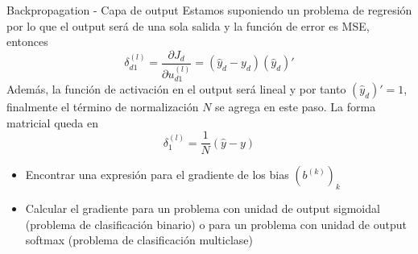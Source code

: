 \documentclass[9pt]{beamer}
\begin{document}
\begin{frame}{Backpropagation - Capa de output}
Estamos suponiendo un problema de regresión por lo que el output será de una sola salida y la función de error es MSE, entonces \pause
\[
\delta_{d1}^{(l)} = \frac{\partial J_d}{\partial u_{d1}^{(l)}} = (\hat{y}_d-y_d) (\hat{y}_d)' 
\] \pause
Además, la función de activación en el output será lineal y por tanto $(\hat{y}_d)' = 1$, finalmente el término de normalización $N$ se agrega en este paso.  La forma matricial queda en \pause
\[
\delta_{1}^{(l)} = \frac{1}{N}(\hat{y}-y)
\]
\pause
\begin{propuesto}
\begin{itemize}
  \item Encontrar una expresión para el gradiente de los bias $(b^{(k)})_k$
  \item Calcular el gradiente para un problema con unidad de output sigmoidal (problema de clasificación binario) o para un problema con unidad de output softmax (problema de clasificación multiclase) 
\end{itemize}
\end{propuesto}


\end{frame}
\end{document}
